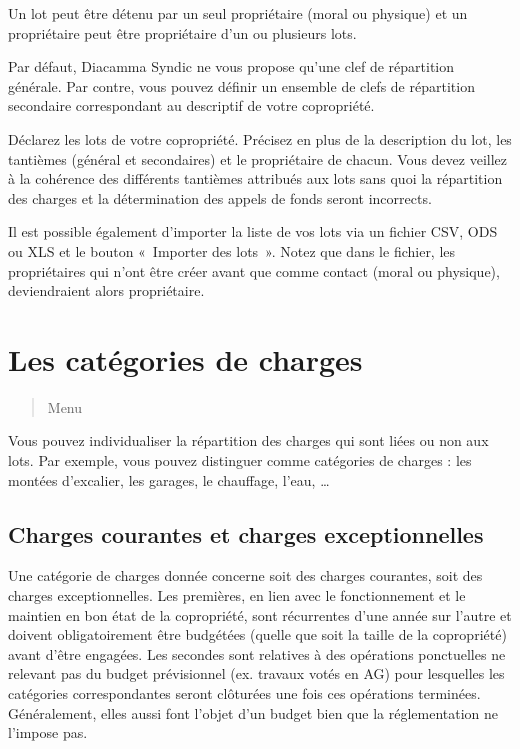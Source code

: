 \documentclass[a4paper,10pt,oneside,french]{sphinxmanual}
\begin{document}
\sphinxAtStartPar
Un lot peut être détenu par un seul propriétaire (moral ou physique) et un propriétaire peut être propriétaire d’un ou plusieurs lots.

\sphinxAtStartPar
Par défaut, Diacamma Syndic ne vous propose qu’une clef de répartition générale.
Par contre, vous pouvez définir un ensemble de clefs de répartition secondaire correspondant au descriptif de votre copropriété.

\sphinxAtStartPar
Déclarez les lots de votre copropriété.
Précisez en plus de la description du lot, les tantièmes (général et secondaires) et le propriétaire de chacun.
Vous devez veillez à la cohérence des différents tantièmes attribués aux lots sans quoi la répartition des charges et la détermination des appels de fonds seront incorrects.
\begin{quote}

\noindent{}
\end{quote}

\sphinxAtStartPar
Il est possible également d’importer la liste de vos lots via un fichier CSV, ODS ou XLS et le bouton « Importer des lots ».
Notez que dans le fichier, les propriétaires qui n’ont être créer avant que comme contact (moral ou physique), deviendraient alors propriétaire.

\sphinxstepscope


\section{Les catégories de charges}
\label{\detokenize{condominium/classloads:les-categories-de-charges}}\label{\detokenize{condominium/classloads::doc}}\begin{quote}

\sphinxAtStartPar
Menu 
\end{quote}

\sphinxAtStartPar
Vous pouvez individualiser la répartition des charges qui sont liées ou non aux lots.
Par exemple, vous pouvez distinguer comme catégories de charges : les montées d’excalier, les garages, le chauffage, l’eau, …


\subsection{Charges courantes et charges exceptionnelles}
\label{\detokenize{condominium/classloads:charges-courantes-et-charges-exceptionnelles}}
\sphinxAtStartPar
Une catégorie de charges donnée concerne soit des charges courantes, soit des charges exceptionnelles.
Les premières, en lien avec le fonctionnement et le maintien en bon état de la copropriété, sont récurrentes d’une année sur l’autre et doivent obligatoirement être budgétées (quelle que soit la taille de la copropriété) avant d’être engagées. Les secondes sont relatives à des opérations ponctuelles ne relevant pas du budget prévisionnel (ex. travaux votés en AG) pour lesquelles les catégories correspondantes seront clôturées une fois ces opérations terminées. Généralement, elles aussi font l’objet d’un budget bien que la réglementation ne l’impose pas.
\end{document}
